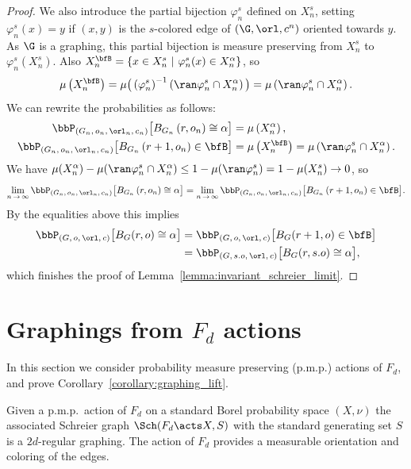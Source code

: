 \begin{proof}
We also introduce the partial bijection $\varphi^s_n$ defined on $X^s_n$, setting $\varphi^s_n(x) = y$ if $(x,y)$ is the $s$-colored edge of $(\G,\orl,c^n)$ oriented towards $y$. As $\G$ is a graphing, this partial bijection is measure preserving from $X^s_n$ to $\varphi^s_n(X^s_n)$. Also $X^{\bfB}_n = \{x \in X^s_n~|~\varphi^s_n(x) \in X^{\alpha}_n\}$, so
\[
\mu\left(X^{\bfB}_n\right) = \mu\big(\left(\varphi^s_n\right)^{-1}\left(\ran\varphi^s_n \cap X^{\alpha}_n \right)\big) = \mu\left(\ran\varphi^s_n \cap X^{\alpha}_n\right).
\]
We can rewrite the probabilities as follows:
\begin{align*}
\bbP_{\left(G_n,\,o_n,\,\orl_n,\,c_n\right)}\big[B_{G_n}\left(r,o_n\right) \cong \alpha\big] &= \mu\left(X^{\alpha}_n\right),
\\
\bbP_{\left(G_n,\,o_n,\,\orl_n,\,c_n\right)}\big[B_{G_n}\left(r+1,o_n\right) \in \bfB\big] &= \mu\left(X^{\bfB}_n\right) = \mu\left(\ran\varphi^s_n \cap X^{\alpha}_n\right).
\end{align*}
We have $\mu(X^{\alpha}_n) - \mu(\ran\varphi^s_n \cap X^{\alpha}_n) \leq 1- \mu(\ran\varphi^s_n) = 1- \mu(X^s_n) \to 0$, so
\[
\lim_{n\,\to\,\infty} \bbP_{\left(G_n,\,o_n,\,\orl_n,\,c_n\right)}\big[B_{G_n}\left(r,o_n\right) \cong \alpha\big] = \lim_{n\,\to\,\infty}
\bbP_{\left(G_n,\,o_n,\,\orl_n,\,c_n\right)}\big[B_{G_n}\left(r+1,o_n\right) \in \bfB\big].
\]
By the equalities above this implies
\begin{align*}
\bbP_{\left(G,\,o,\,\orl,\,c\right)}\big[B_G(r,o) \cong \alpha\big] &= \bbP_{\left(G,\,o,\,\orl,\,c\right)}\big[B_G(r+1,o) \in \bfB\big] \\
&= \bbP_{\left(G,\,s.o,\,\orl,\,c\right)}\big[B_G(r,s.o) \cong \alpha\big],
\end{align*}
which finishes the proof of Lemma~\ref{lemma:invariant_schreier_limit}.
\end{proof}

\section{Graphings from \texorpdfstring{$F_d$}{Fd} actions} \label{section:graphings}

In this section we consider probability measure preserving (p.m.p.) actions of $F_d$, and prove Corollary~\ref{corollary:graphing_lift}.

Given a p.m.p.\ action of $F_d$ on a standard Borel probability space $(X, \nu)$ the associated Schreier graph $\Sch(F_d \acts X, S)$ with the standard generating set $S$ is a $2d$-regular graphing. The action of $F_d$ provides a measurable orientation and coloring of the edges.

